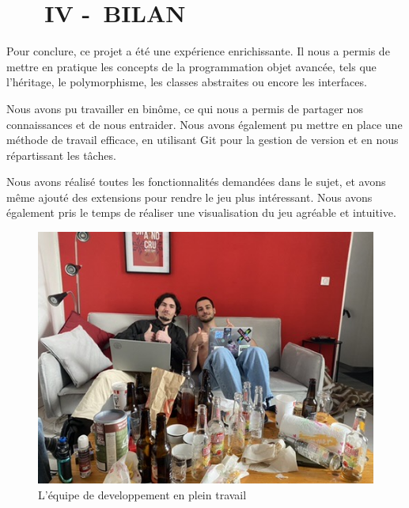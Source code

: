 \chapter[~~~BILAN]{~~~IV -~BILAN}%
\label{cls}

Pour conclure, ce projet a été une expérience enrichissante. Il nous a permis de mettre en pratique les concepts de la programmation objet avancée, tels que l'héritage, le polymorphisme, les classes abstraites ou encore les interfaces.
\bigskip

Nous avons pu travailler en binôme, ce qui nous a permis de partager nos connaissances et de nous entraider. Nous avons également pu mettre en place une méthode de travail efficace, en utilisant Git pour la gestion de version et en nous répartissant les tâches.
\bigskip

Nous avons réalisé toutes les fonctionnalités demandées dans le sujet, et avons même ajouté des extensions pour rendre le jeu plus intéressant. Nous avons également pris le temps de réaliser une visualisation du jeu agréable et intuitive.
\bigskip

\begin{figure}[!ht]
    \centering%
    \includegraphics[width=13cm]{assets/pictures/FA9F88F7-EF79-42C3-90B1-35315309BABB_4_5005_c.jpeg} 
    \caption{L'équipe de developpement en plein travail}%
  \end{figure}
  \bigskip
\newpage